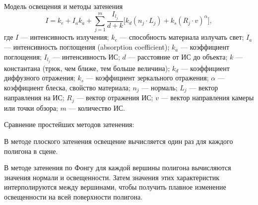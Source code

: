 \documentclass{beamer}
\begin{document}
	\begin{frame}{Модель освещения и методы затенения}
		\[
			I = k_e + I_a k_a + \sum_{j=1}^{m} \frac{I_{l_j}}{d+k} \bigg[ k_d (n_j \cdot L_j) + k_s (R_j \cdot v)^\alpha \bigg]
		,
		\]
		где
		$I$ --- интенсивность излучения;
		$k_e$ --- способность материала излучать свет;
		$I_a$ --- интенсивность поглощения (absorption coefficient);
		$k_a$ --- коэффициент поглощения;
		$I_{l_j}$ --- интенсивность ИС;
		$d$ --- расстояние от ИС до объекта;
		$k$ --- константана (трюк, чем ближе, тем больше величина);
		$k_d$ --- коэффициент диффузного отражения;
		$k_s$ --- коэффициент зеркального отражения;
		$\alpha$ --- коэффициент блеска, свойство материала;
		$n_j$ --- нормаль;
		$L_j$ --- вектор направления на ИС;
		$R_j$ --- вектор отражения ИС;
		$v$ --- вектор направления камеры или точки обзора;
		$m$ --- количество ИС.

		Сравнение простейших методов затенения:

		В методе плоского затенения освещение вычисляется один раз для каждого полигона в сцене.

		В методе затенения по Фонгу для каждой вершины полигона вычисляются значения нормали и освещенности. Затем значения этих характеристик интерполируются между вершинами, чтобы получить плавное изменение освещенности на всей поверхности полигона.



		
	\end{frame}
\end{document}
